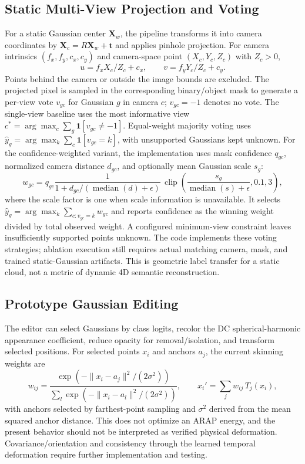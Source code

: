 \documentclass[conference]{IEEEtran}
\begin{document}
\subsection{Static Multi-View Projection and Voting}
For a static Gaussian center $\mathbf{X}_w$, the pipeline transforms it into camera coordinates by $\mathbf{X}_c=R\mathbf{X}_w+\mathbf{t}$ and applies pinhole projection. For camera intrinsics $(f_x,f_y,c_x,c_y)$ and camera-space point $(X_c,Y_c,Z_c)$ with $Z_c>0$,
\begin{equation}
 u=f_x X_c/Z_c+c_x, \qquad v=f_y Y_c/Z_c+c_y.
\end{equation}
Points behind the camera or outside the image bounds are excluded. The projected pixel is sampled in the corresponding binary/object mask to generate a per-view vote $v_{gc}$ for Gaussian $g$ in camera $c$; $v_{gc}=-1$ denotes no vote. The single-view baseline uses the most informative view $c^*=\arg\max_c\sum_g\mathbf{1}[v_{gc}\ne -1]$. Equal-weight majority voting uses $\hat{y}_g=\arg\max_k\sum_c\mathbf{1}[v_{gc}=k]$, with unsupported Gaussians kept unknown. For the confidence-weighted variant, the implementation uses mask confidence $q_{gc}$, normalized camera distance $d_{gc}$, and optionally mean Gaussian scale $s_g$:
\begin{equation}
w_{gc}=q_{gc}\frac{1}{1+d_{gc}/(\operatorname{median}(d)+\epsilon)}\,\operatorname{clip}\!\left(\frac{s_g}{\operatorname{median}(s)+\epsilon},0.1,3\right),
\end{equation}
where the scale factor is one when scale information is unavailable. It selects $\hat{y}_g=\arg\max_k\sum_{c:v_{gc}=k}w_{gc}$ and reports confidence as the winning weight divided by total observed weight. A configured minimum-view constraint leaves insufficiently supported points unknown. The code implements these voting strategies; ablation execution still requires actual matching camera, mask, and trained static-Gaussian artifacts. This is geometric label transfer for a static cloud, not a metric of dynamic 4D semantic reconstruction.

\subsection{Prototype Gaussian Editing}
The editor can select Gaussians by class logits, recolor the DC spherical-harmonic appearance coefficient, reduce opacity for removal/isolation, and transform selected positions. For selected points $x_i$ and anchors $a_j$, the current skinning weights are
\begin{equation}
w_{ij}=\frac{\exp(-\|x_i-a_j\|^2/(2\sigma^2))}{\sum_l\exp(-\|x_i-a_l\|^2/(2\sigma^2))},\qquad
x_i'=\sum_j w_{ij}\,T_j(x_i),
\end{equation}
with anchors selected by farthest-point sampling and $\sigma^2$ derived from the mean squared anchor distance. This does not optimize an ARAP energy, and the present behavior should not be interpreted as verified physical deformation. Covariance/orientation and consistency through the learned temporal deformation require further implementation and testing.
\end{document}
